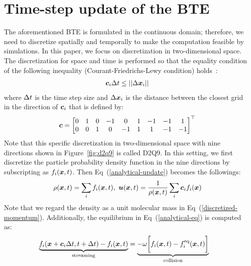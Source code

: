 \section{Time-step update of the BTE}
The aforementioned BTE is formulated in the 
continuous domain; therefore,
we need to discretize spatially and 
temporally to make the computation 
feasible by simulations.
In this paper, we focus on discretization
in two-dimensional space.
The discretization for space and time
is performed so that the equality condition of 
the following inequality
(Courant-Friedrichs-Lewy condition) holds~\cite{peyretcomputational, sterling1996stability}:
\begin{equation}
\begin{aligned}
  \boldsymbol{c}_i \Delta t \leq || \Delta \boldsymbol{x}_i ||
\end{aligned}
\end{equation}
where $\Delta t$ is the time step size 
and $\Delta \boldsymbol{x}_i$ is the distance between 
the closest grid in the direction
of $\boldsymbol{c}_i$ that is defined by:
\begin{equation}
\begin{aligned}
  \boldsymbol{c} = \begin{bmatrix}
    0 & 1 & 0 & -1 & 0 & 1 & -1 & -1 & 1 \\
    0 & 0 & 1 & 0 & -1 & 1 & 1 & -1 & -1 \\
  \end{bmatrix}^\top
\end{aligned}
\label{d2q9-velocity}
\end{equation}
Note that this specific discretization in two-dimensional
space with nine directions shown in 
Figure~\ref{fig:d2q9} is called D2Q9.
In this setting, 
we first discretize
the particle probability density function
in the nine directions by subscripting 
as $f_i(\boldsymbol{x}, t)$.
Then Eq~(\ref{analytical-update}) becomes the followings:
\begin{equation}
  \begin{aligned}
    \rho(\boldsymbol{x}, t) = \sum_i f_i(\boldsymbol{x}, t),~
    \boldsymbol{u}(\boldsymbol{x}, t) = 
    \frac{1}{\rho(\boldsymbol{x}, t)} \sum_i \boldsymbol{c}_i f_i(\boldsymbol{x}) \\
  \end{aligned}
  \label{discretized-momentum}
\end{equation}
Note that we regard the density as
a unit molecular mass in Eq~(\ref{discretized-momentum}).
Additionally, the equilibrium in Eq~(\ref{analytical-eq}) is computed as:
\begin{equation}
\begin{aligned}
  \underbrace{f_i(\boldsymbol{x} + \boldsymbol{c}_i\Delta t , t + \Delta t) - f_i(\boldsymbol{x}, t)}_{
    \text{streaming}
  } &= 
  \underbrace{- \omega 
  \biggl[
    f_i(\boldsymbol{x}, t) -
    f^{\rm eq}_i(\boldsymbol{x}, t)
  \biggl]}_{
    \text{collision}
  }
\end{aligned}
\label{discretized-streaming}
\end{equation}
